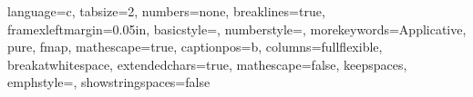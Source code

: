 \usepackage[T1]{fontenc}
\usepackage{mathpazo}
\usepackage[scaled=0.85]{beramono}

\usepackage{textpos}
\usepackage{paralist}
\usepackage{expdlist}
\usepackage{subfigure}
\usepackage{amssymb, amsmath, amsthm}
\everymath{\displaystyle}

\usepackage[T1]{fontenc}
\usepackage{mathpazo}


\newcommand{\code}[1]{\texttt{#1}}
\newcommand{\mono}[1]{\texttt{#1}}
\newcommand{\textt}[1]{\ensuremath{\text{\mono{#1}}}}
\newcommand{\mathmono}[1]{\ensuremath{\text{\mono{#1}}}}
\newcommand{\nonterm}[1]{\ensuremath{\text{\mono{<#1>}}}}
\newcommand{\term}[1]{\ensuremath{\text{\mono{`#1'}}}}
\newcommand{\any}[0]{\ensuremath{\left\langle\bigtriangleup\right\rangle}}
\newcommand{\D}{$\Delta$}

\newcommand{\makeTable}[6][htbp!]
{
	\begin{table}[#1]
	\centering
	\begin{tabular}{#4}
	#5\\
	#6\\
	\end{tabular}
	\end{table}
}

\newcommand{\includeFigure}[4][htbp!]
{
	\begin{figure}[#4]
	\centering
	\IfDecimal{#1}
	{
		\texttt{[image: figures/\#2]}
	}
	{
		\texttt{[image: figures/\#2]}
	}
	\caption[]{#3}
	\label{figure:#2}
	\end{figure}
}

\usepackage{clrscode3e}
\usepackage{verbatim}
\usepackage{listings}
\lstset
{
  language=c,
	tabsize=2,
	numbers=none,
	breaklines=true,
	framexleftmargin=0.05in,
	basicstyle=\ttfamily,
	numberstyle=\tiny,
  morekeywords={Applicative, pure, fmap},
  mathescape=true,
  captionpos=b,
  columns=fullflexible,
  breakatwhitespace,
  extendedchars=true,
  mathescape=false,
  keepspaces,
  emphstyle={\bf},
  showstringspaces=false
}

